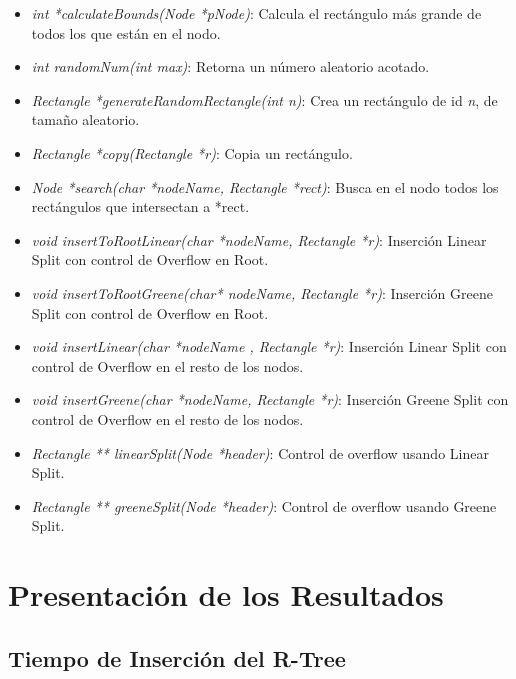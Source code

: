 \documentclass[letterpaper,10pt]{article}
\begin{document}
\begin{itemize}
		\item \textit{int *calculateBounds(Node *pNode)}: Calcula el rectángulo más grande de todos los que están en el nodo.
		\item \textit{int randomNum(int max)}: Retorna un número aleatorio acotado.
		\item \textit{Rectangle *generateRandomRectangle(int n)}: Crea un rectángulo de id \textit{n}, de tamaño aleatorio.
		\item \textit{Rectangle *copy(Rectangle *r)}: Copia un rectángulo.
		\item \textit{Node *search(char *nodeName, Rectangle *rect)}: Busca en el nodo todos los rectángulos que intersectan a *rect.
		\item \textit{void insertToRootLinear(char *nodeName, Rectangle *r)}: Inserción Linear Split con control de Overflow en Root.
		\item \textit{void insertToRootGreene(char* nodeName, Rectangle *r)}: Inserción Greene Split con control de Overflow en Root.
		\item \textit{void insertLinear(char *nodeName , Rectangle *r)}: Inserción Linear Split con control de Overflow en el resto de los nodos.
		\item \textit{void insertGreene(char *nodeName, Rectangle *r)}: Inserción Greene Split con control de Overflow en el resto de los nodos.
		\item \textit{Rectangle ** linearSplit(Node *header)}: Control de overflow usando Linear Split.
		\item \textit{Rectangle ** greeneSplit(Node *header)}: Control de overflow usando Greene Split.
	\end{itemize}

	\newpage

	\section{Presentación de los Resultados}

	\subsection{Tiempo de Inserción del R-Tree}
\end{document}

